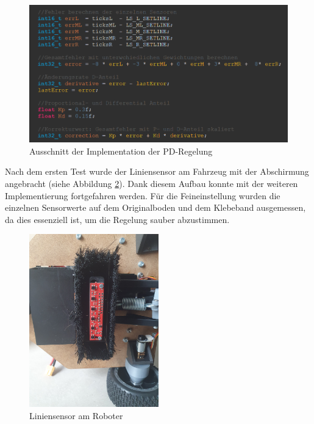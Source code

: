  \begin{figure}[H]
\centering
\includegraphics[width= \textwidth ]{assets/ET/PD-Regler/PD-Regler_Code_Pren2.png}
\caption{Ausschnitt der Implementation der PD-Regelung}
\label{fig:Ausschnitt der Implementation der PD-Regelung}
\end{figure}


Nach dem ersten Test wurde der Liniensensor am Fahrzeug mit der Abschirmung angebracht (siehe Abbildung \ref{fig:linsen-robi}). Dank diesem Aufbau konnte mit der weiteren Implementierung fortgefahren werden. Für die Feineinstellung wurden die einzelnen Sensorwerte auf dem Originalboden und dem Klebeband ausgemessen, da dies essenziell ist, um die Regelung sauber abzustimmen.

 \begin{figure}[H]
\centering
\includegraphics[width=0.5\textwidth ]{assets/MT/liniensensor-robi.jpg}
\caption{Liniensensor am Roboter}
\label{fig:linsen-robi}
\end{figure}


\newpage

